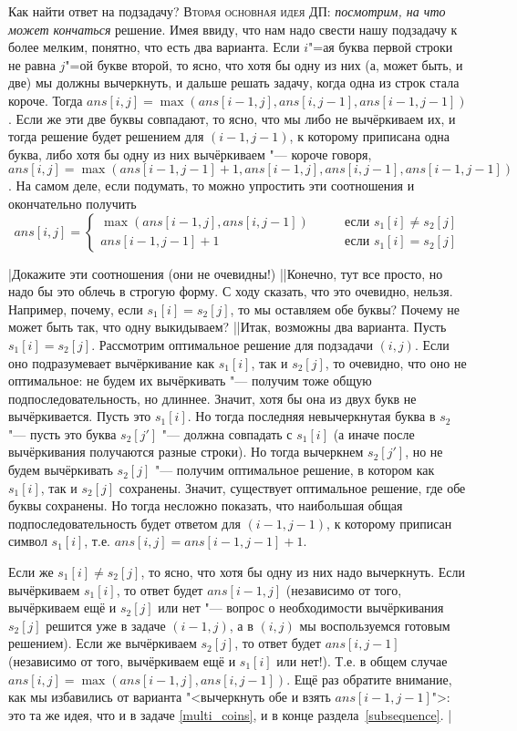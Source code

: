 {
Как найти ответ на подзадачу? \textsc{Вторая основная идея ДП:} \textit{посмотрим, на что может 
кончаться} решение. Имея ввиду, что нам надо свести нашу подзадачу к более мелким, понятно, что 
есть два варианта. Если $i$"=ая буква первой строки не равна $j$"=ой букве второй, то ясно, что 
хотя бы одну из них (а, может быть, и две) мы должны вычеркнуть, и дальше решать задачу, когда одна 
из строк стала короче. Тогда $ans[i,j]=\max(ans[i-1,j],ans[i,j-1],ans[i-1,j-1])$. Если же эти две 
буквы совпадают, то ясно, что мы либо не вычёркиваем их, и тогда решение будет решением для 
$(i-1,j-1)$, к которому приписана одна буква, либо хотя бы одну из них вычёркиваем "--- короче 
говоря, $ans[i,j]=\max(ans[i-1,j-1]+1,ans[i-1,j],ans[i,j-1],ans[i-1,j-1])$. На самом деле, если 
подумать, то можно упростить эти соотношения и окончательно получить
}
$$
ans[i,j]=\left\{\begin{array}{ll}
\max(ans[i-1,j],ans[i,j-1])\qquad&\mbox{если }s_1[i]\neq s_2[j]\\
ans[i-1,j-1]+1\qquad&\mbox{если }s_1[i]=s_2[j]
\end{array}\right.
$$

\task|Докажите эти соотношения (они не очевидны!)
||Конечно, тут все просто, но надо бы это облечь в строгую форму. С ходу сказать, что это очевидно, 
нельзя. Например, почему, если $s_1[i]=s_2[j]$, то мы оставляем обе буквы? Почему не может быть 
так, что одну выкидываем?
||Итак, возможны два варианта. Пусть $s_1[i]=s_2[j]$. Рассмотрим оптимальное решение для подзадачи 
$(i,j)$. Если оно подразумевает вычёркивание как $s_1[i]$, так и $s_2[j]$, то очевидно, что оно не 
оптимальное: не будем их вычёркивать "--- получим тоже общую подпоследовательность, но длиннее. 
Значит, хотя бы она из двух букв не вычёркивается. Пусть это $s_1[i]$. Но тогда последняя 
невычеркнутая буква в $s_2$ "--- пусть это буква $s_2[j']$ "--- должна совпадать с $s_1[i]$ (а 
иначе после вычёркивания получаются разные строки). Но тогда вычеркнем $s_2[j']$, но не будем 
вычёркивать $s_2[j]$ "--- получим оптимальное решение, в котором как $s_1[i]$, так и $s_2[j]$ 
сохранены. Значит, существует оптимальное решение, где обе буквы сохранены. Но тогда несложно 
показать, что наибольшая общая подпоследовательность будет ответом для $(i-1,j-1)$, к которому 
приписан символ $s_1[i]$, т.е. $ans[i,j]=ans[i-1,j-1]+1$.

Если же $s_1[i]\neq s_2[j]$, то ясно, что хотя бы одну из них надо вычеркнуть. Если вычёркиваем 
$s_1[i]$, то ответ будет $ans[i-1,j]$ (независимо от того, вычёркиваем ещё и $s_2[j]$ или нет "--- 
вопрос о необходимости вычёркивания $s_2[j]$ решится уже в задаче $(i-1,j)$, а в $(i,j)$ мы 
воспользуемся готовым решением). 
Если же вычёркиваем $s_2[j]$, то ответ будет $ans[i,j-1]$ (независимо от того, вычёркиваем ещё и 
$s_1[i]$ или нет!). Т.е. в общем случае $ans[i,j]=\max(ans[i-1,j],ans[i,j-1])$. Ещё раз обратите 
внимание, как мы избавились от варианта "<вычеркнуть обе и взять $ans[i-1,j-1]$">: это та же идея, 
что и в задаче \ref{multi_coins}, и в конце раздела~\ref{subsequence}.
|\label{LCS:proof}


